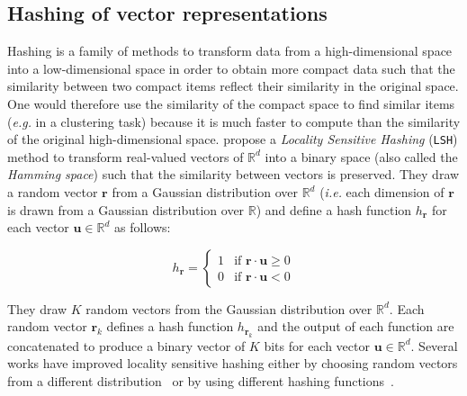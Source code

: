   \subsection{Hashing of vector representations}
    \label{ch04:subsec:hashing}
    Hashing is a family of methods to transform data from a high-dimensional
    space into a low-dimensional space in order to obtain more compact data such
    that the similarity between two compact items reflect their similarity in
    the original space. One would therefore use the similarity of the compact
    space to find similar items (\textit{e.g.} in a clustering task) because it
    is much faster to compute than the similarity of the original
    high-dimensional space. \citeauthor{charikar2002similarity}
    \citep{charikar2002similarity} propose a \textit{Locality Sensitive Hashing}
    (\texttt{LSH}) method to transform real-valued vectors of $\mathbb{R}^d$
    into a binary space (also called the \textit{Hamming space}) such that the
    similarity between vectors is preserved. They draw a random vector
    $\mathbf{r}$ from a Gaussian distribution over $\mathbb{R}^d$ (\textit{i.e.}
    each dimension of $\mathbf{r}$ is drawn from a Gaussian distribution over
    $\mathbb{R}$) and define a hash function $h_{\mathbf{r}}$ for each vector
    $\mathbf{u} \in \mathbb{R}^d$ as follows:

    \[
      h_{\mathbf{r}} =
      \begin{cases}
            1 & \text{if }\mathbf{r} \cdot \mathbf{u} \geq 0 \\
            0 & \text{if }\mathbf{r} \cdot \mathbf{u} < 0
      \end{cases}
    \]

    \noindent They draw $K$ random vectors from the Gaussian distribution over
    $\mathbb{R}^d$. Each random vector $\mathbf{r}_k$ defines a hash function $
    h_{\mathbf{r}_k}$ and the output of each function are concatenated to
    produce a binary vector of $K$ bits for each vector $\mathbf{u} \in
    \mathbb{R}^d$. Several works have improved locality sensitive hashing either
    by choosing random vectors from a different
    distribution~\citep{datar2004locality} or by using different hashing
    functions~\citep{andoni2006near}.\medskip


